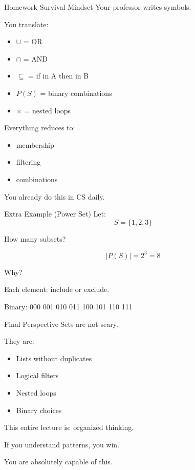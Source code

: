 \documentclass[landscape]{beamer}
\begin{document}
\begin{frame}{Homework Survival Mindset}
Your professor writes symbols.

You translate:

\begin{itemize}
\item $\cup$ = OR
\item $\cap$ = AND
\item $\subseteq$ = if in A then in B
\item $P(S)$ = binary combinations
\item $\times$ = nested loops
\end{itemize}

Everything reduces to:
\begin{itemize}
\item membership
\item filtering
\item combinations
\end{itemize}

You already do this in CS daily.
\end{frame}

\begin{frame}{Extra Example (Power Set)}
Let:
\[
S=\{1,2,3\}
\]

How many subsets?

\[
|P(S)| = 2^3 = 8
\]

Why?

Each element:
include or exclude.

Binary:
000
001
010
011
100
101
110
111
\end{frame}

\begin{frame}{Final Perspective}
Sets are not scary.

They are:

\begin{itemize}
\item Lists without duplicates
\item Logical filters
\item Nested loops
\item Binary choices
\end{itemize}

This entire lecture is:
organized thinking.

If you understand patterns,
you win.

You are absolutely capable of this.
\end{frame}
\end{document}
